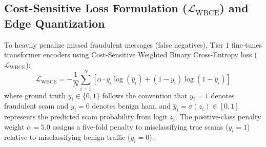 \documentclass[journal]{IEEEtran}
\begin{document}
\begin{table}[h]
\centering
\caption{Source Breakdown and Class Balance Across Corpus Partitions}
\label{tab:dataset_sources}
\renewcommand{\arraystretch}{0.92}
\end{table}

\subsection{Cost-Sensitive Loss Formulation ($\mathcal{L}_{\text{WBCE}}$) and Edge Quantization}
\label{subsec:wbce_quant}

To heavily penalize missed fraudulent messages (false negatives), Tier 1 fine-tunes transformer encoders using Cost-Sensitive Weighted Binary Cross-Entropy loss ($\mathcal{L}_{\text{WBCE}}$):
\begin{equation}
\label{eq:wbce}
\mathcal{L}_{\text{WBCE}} = -\frac{1}{N} \sum_{i=1}^{N} \left[ \alpha \cdot y_i \log(\hat{y}_i) + (1 - y_i) \log(1 - \hat{y}_i) \right]
\end{equation}
where ground truth $y_i \in \{0, 1\}$ follows the convention that $y_i = 1$ denotes fraudulent scam and $y_i = 0$ denotes benign ham, and $\hat{y}_i = \sigma(z_i) \in [0, 1]$ represents the predicted scam probability from logit $z_i$. The positive-class penalty weight $\alpha = 5.0$ assigns a five-fold penalty to misclassifying true scams ($y_i=1$) relative to misclassifying benign traffic ($y_i=0$). 
\end{document}

